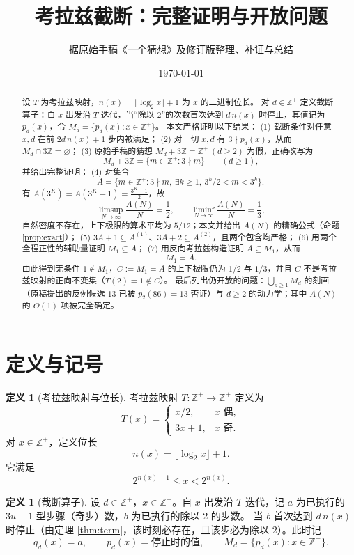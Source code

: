 \documentclass[11pt]{article}
\title{考拉兹截断：完整证明与开放问题}
\author{据原始手稿《一个猜想》及修订版整理、补证与总结}
\date{\today}
\theoremstyle{definition}
\newtheorem{definition}[theorem]{定义}
\theoremstyle{definition}
\theoremstyle{remark}
\begin{document}
\maketitle

\begin{abstract}
设 \(T\) 为考拉兹映射，\(n(x)=\lfloor\log_2 x\rfloor+1\) 为 \(x\) 的二进制位长。
对 \(d\in\mathbb Z^+\) 定义截断算子：自 \(x\) 出发沿 \(T\) 迭代，当“除以 2”的次数首次达到 \(d\,n(x)\) 时停止，其值记为 \(p_d(x)\)，令 \(M_d=\{p_d(x):x\in\mathbb Z^+\}\)。
本文严格证明以下结果：
(1) 截断条件对任意 \(x,d\) 在前 \(2d\,n(x)+1\) 步内被满足；
(2) 对一切 \(x,d\) 有 \(3\nmid p_d(x)\)，从而 \(M_d\cap3\mathbb Z=\varnothing\)；
(3) 原始手稿的猜想 \(M_d+3\mathbb Z=\mathbb Z^+\ (d\ge2)\) 为假，正确改写为
\[
M_d+3\mathbb Z=\{m\in\mathbb Z^+:3\nmid m\}\qquad(d\ge1),
\]
并给出完整证明；
(4) 对集合
\[
A=\{m\in\mathbb Z^+:3\nmid m,\ \exists k\ge1,\ 3^k/2<m<3^k\},
\]
有 \(A(3^K)=A(3^K-1)=\frac{3^K-1}{2}\)，故
\[
\limsup_{N\to\infty}\frac{A(N)}{N}=\frac12,\qquad \liminf_{N\to\infty}\frac{A(N)}{N}=\frac13,
\]
自然密度不存在，上下极限的算术平均为 \(5/12\)；本文并给出 \(A(N)\) 的精确公式（命题 \ref{prop:exact}）；
(5) \(3A+1\subseteq A^{(1)}\)、\(3A+2\subseteq A^{(2)}\)，且两个包含均严格；
(6) 用两个全程正性的辅助量证明 \(M_1\subseteq A\)；
(7) 用反向考拉兹构造证明 \(A\subseteq M_1\)，从而
\[
\boxed{M_1=A}.
\]
由此得到无条件 \(1\notin M_1\)，\(C:=M_1=A\) 的上下极限仍为 \(1/2\) 与 \(1/3\)，并且 \(C\) 不是考拉兹映射的正向不变集（\(T(2)=1\notin C\)）。
最后列出仍开放的问题：\(\bigcup_{d\ge1}M_d\) 的刻画（原稿提出的反例候选 \(13\) 已被 \(p_2(86)=13\) 否证）与 \(d\ge2\) 的动力学；其中 \(A(N)\) 的 \(O(1)\) 项被完全确定。
\end{abstract}

\section{定义与记号}

\begin{definition}[考拉兹映射与位长]
考拉兹映射 \(T:\mathbb Z^+\to\mathbb Z^+\) 定义为
\[
T(x)=
\begin{cases}
x/2, & x\text{ 偶},\\
3x+1, & x\text{ 奇}.
\end{cases}
\]
对 \(x\in\mathbb Z^+\)，定义位长
\[
n(x)=\lfloor\log_2 x\rfloor+1.
\]
它满足
\[
2^{n(x)-1}\le x<2^{n(x)}.
\]
\end{definition}

\begin{definition}[截断算子]\label{def:trunc}
设 \(d\in\mathbb Z^+\)，\(x\in\mathbb Z^+\)。自 \(x\) 出发沿 \(T\) 迭代，记 \(a\) 为已执行的 \(3u+1\) 型步骤（奇步）数，\(b\) 为已执行的除以 2 的步数。
当 \(b\) 首次达到 \(d\,n(x)\) 时停止（由定理 \ref{thm:term}，该时刻必存在，且该步必为除以 2）。此时记
\[
q_d(x)=a,\qquad p_d(x)=\text{停止时的值},\qquad M_d=\{p_d(x):x\in\mathbb Z^+\}.
\]
\end{definition}
\end{document}

